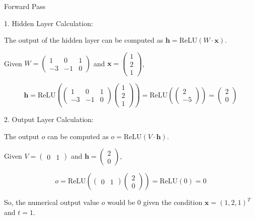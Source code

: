 Forward Pass

1. Hidden Layer Calculation: 

    The output of the hidden layer can be computed as \( \mathbf{h} = \text{ReLU}(W \cdot \mathbf{x}) \).
    
    Given \( W = \begin{pmatrix} 1 & 0 & 1 \\ -3 & -1 & 0 \end{pmatrix} \) and \( \mathbf{x} = \begin{pmatrix} 1 \\ 2 \\ 1 \end{pmatrix} \),
    
    \[
    \mathbf{h} = \text{ReLU}\left(\begin{pmatrix} 1 & 0 & 1 \\ -3 & -1 & 0 \end{pmatrix} \begin{pmatrix} 1 \\ 2 \\ 1 \end{pmatrix}\right)
    = \text{ReLU}\left(\begin{pmatrix} 2 \\ -5 \end{pmatrix}\right)
    = \begin{pmatrix} 2 \\ 0 \end{pmatrix}
    \]

2. Output Layer Calculation: 

    The output \( o \) can be computed as \( o = \text{ReLU}(V \cdot \mathbf{h}) \).
    
    Given \( V = \begin{pmatrix} 0 & 1 \end{pmatrix} \) and \( \mathbf{h} = \begin{pmatrix} 2 \\ 0 \end{pmatrix} \),
    
    \[
    o = \text{ReLU}\left(\begin{pmatrix} 0 & 1 \end{pmatrix} \begin{pmatrix} 2 \\ 0 \end{pmatrix}\right)
    = \text{ReLU}(0)
    = 0
    \]

So, the numerical output value \( o \) would be 0 given the condition \( \mathbf{x} = (1, 2, 1)^T \) and \( t = 1 \).

